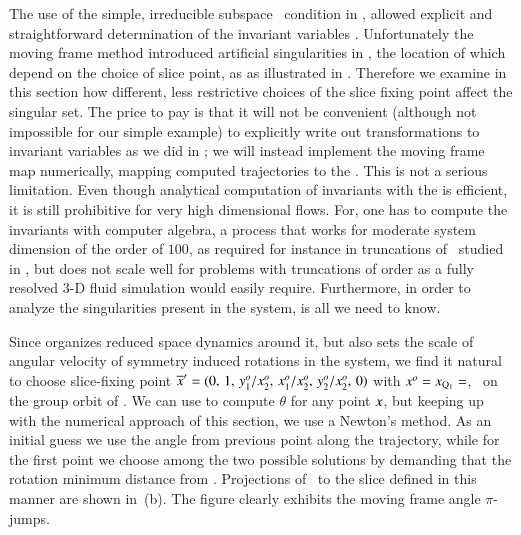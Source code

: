 \documentclass[preprint,number,sort&compress]{elsarticle}
\begin{document}
The use of the simple, irreducible subspace \slice\ condition
in ,  allowed
explicit and straightforward determination of the invariant
variables . Unfortunately the moving frame
method introduced artificial singularities in \reducedsp, the
location of which depend on the choice of slice point, as
as illustrated in . Therefore we examine in
this section how different, less restrictive choices of the slice
fixing point affect the singular set. The price to pay is
that it will not be convenient (although not impossible for our
simple example) to explicitly write out transformations to
invariant variables as we did in ; we will
instead implement the moving frame map numerically, mapping
computed trajectories to the \slice. This is not a serious
limitation. Even though analytical computation of invariants
with the {\mframes} is efficient, it is still prohibitive for
very high dimensional flows. For, one has to compute the
invariants with computer algebra, a process that
works for moderate system dimension of the
order of $100$, as required for instance in truncations of
\KSe\ studied in , but does not scale well for
problems with truncations of order  as a fully
resolved $3$-D fluid simulation would easily
require. Furthermore, in order to analyze the
singularities present in the system, 
is all we need to know.

Since  organizes reduced space dynamics around it,
but also sets the scale of angular velocity of symmetry
induced rotations in the system, we find it natural to choose
slice-fixing point
${\overline{x}'}=(0,\,1,\,y_1^{o}/x_2^{o},\,x_1^{o}/x_2^{o},\,y_2^{o}/x_2^{o},\,0)$
with $x^{o}= x_{\mathrm{Q}_{1}}=$, \ie\ on
the group orbit of \reqv. We can use  to compute
$\theta$ for any point $x$, but keeping up with the
numerical approach of this section, we use a Newton's method.
As an initial guess we use the angle from previous point along
the trajectory, while for the first point we choose among the
two possible solutions by demanding that the rotation 
minimum distance from \slicep. Projections of
\cLf\ to the slice defined in this manner are shown in
\,(b). The figure clearly exhibits the
moving frame angle $\pi$-jumps.
\end{document}
